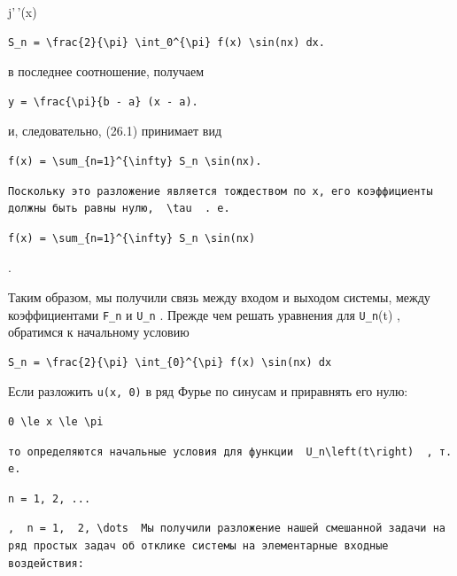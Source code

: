 \documentclass[
  ukrainian,
]{article}
\begin{document}
j'\,'(x)

\begin{verbatim}
S_n = \frac{2}{\pi} \int_0^{\pi} f(x) \sin(nx) dx.
\end{verbatim}

в последнее соотношение, получаем

\begin{verbatim}
y = \frac{\pi}{b - a} (x - a).
\end{verbatim}

и, следовательно, (26.1) принимает вид

\begin{verbatim}
f(x) = \sum_{n=1}^{\infty} S_n \sin(nx).
\end{verbatim}

\begin{verbatim}
Поскольку это разложение является тождеством по x, его коэффициенты должны быть равны нулю,  \tau  . е.
\end{verbatim}

\begin{verbatim}
f(x) = \sum_{n=1}^{\infty} S_n \sin(nx)
\end{verbatim}

.

Таким образом, мы получили связь между входом и выходом системы, между
коэффициентами \texttt{F\_n} и \texttt{U\_n} . Прежде чем решать
уравнения для \texttt{U\_n}(t) , обратимся к начальному условию

\begin{verbatim}
S_n = \frac{2}{\pi} \int_{0}^{\pi} f(x) \sin(nx) dx
\end{verbatim}

Если разложить \texttt{u(x,\ 0)} в ряд Фурье по синусам и приравнять его
нулю:

\begin{verbatim}
0 \le x \le \pi
\end{verbatim}

\begin{verbatim}
то определяются начальные условия для функции  U_n\left(t\right)  , т. е.
\end{verbatim}

\begin{verbatim}
n = 1, 2, ...
\end{verbatim}

\begin{verbatim}
,  n = 1,  2, \dots  Мы получили разложение нашей смешанной задачи на ряд простых задач об отклике системы на элементарные входные воздействия:
\end{verbatim}
\end{document}
